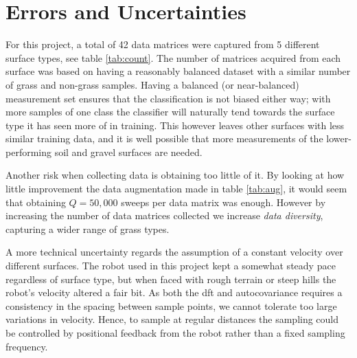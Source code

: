\section{Errors and Uncertainties}
For this project, a total of 42 data matrices were captured from 5 different surface types, see table \ref{tab:count}. The number of matrices acquired from each surface was based on having a reasonably balanced dataset with a similar number of grass and non-grass samples. Having a balanced (or near-balanced) measurement set ensures that the classification is not biased either way; with more samples of one class the classifier will naturally tend towards the surface type it has seen more of in training. This however leaves other surfaces with less similar training data, and it is well possible that more measurements of the lower-performing soil and gravel surfaces are needed.  


Another risk when collecting data is obtaining too little of it. By looking at how little improvement the data augmentation made in table \ref{tab:aug}, it would seem that obtaining $Q=50,000$ sweeps per data matrix was enough. However by increasing the number of data matrices collected we increase \emph{data diversity}, capturing a wider range of grass types. 

A more technical uncertainty regards the assumption of a constant velocity over different surfaces. The robot used in this project kept a somewhat steady pace regardless of surface type, but when faced with rough terrain or steep hills the robot's velocity altered a fair bit. As both the \gls{dft} and autocovariance requires a consistency in the spacing between sample points, we cannot tolerate too large variations in velocity. Hence, to sample at regular distances the sampling could be controlled by positional feedback from the robot rather than a fixed sampling frequency.

